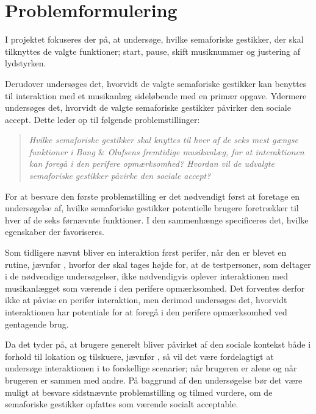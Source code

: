 \section{Problemformulering}
\label{Problemformulering}
%
I projektet fokuseres der på, at undersøge, hvilke semaforiske gestikker, der skal tilknyttes de valgte funktioner; start, pause, skift musiknummer og justering af lydstyrken. 

Derudover undersøges det, hvorvidt de valgte semaforiske gestikker kan benyttes til interaktion med et musikanlæg sideløbende med en primær opgave. Ydermere undersøges det, hvorvidt de valgte semaforiske gestikker påvirker den sociale accept. Dette leder op til følgende problemstillinger:\blankline
%
\begin{quotation}
	\noindent
	\textit{Hvilke semaforiske gestikker skal knyttes til hver af de seks mest gængse funktioner i Bang $\&$ Olufsens fremtidige musikanlæg, for at interaktionen kan foregå i den perifere opmærksomhed?\blankline
		Hvordan vil de udvalgte semaforiske gestikker påvirke den sociale accept?}\blankline
\end{quotation}
%
For at besvare den første problemstilling er det nødvendigt først at foretage en undersøgelse af, hvilke semaforiske gestikker potentielle brugere foretrækker til hver af de seks førnævnte funktioner. I den sammenhænge specificeres det, hvilke egenskaber der favoriseres.

Som tidligere nævnt bliver en interaktion først perifer, når den er blevet en rutine, jævnfør , hvorfor der skal tages højde for, at de testpersoner, som deltager i de nødvendige undersøgelser, ikke nødvendigvis oplever interaktionen med musikanlægget som værende i den perifere opmærksomhed. Det forventes derfor ikke at påvise en perifer interaktion, men derimod undersøges det, hvorvidt interaktionen har potentiale for at foregå i den perifere opmærksomhed ved gentagende brug. 

Da det tyder på, at brugere generelt bliver påvirket af den sociale kontekst både i forhold til lokation og tilskuere, jævnfør , så vil det være fordelagtigt at undersøge interaktionen i to forskellige scenarier; når brugeren er alene og når brugeren er sammen med andre. På baggrund af den undersøgelse bør det være muligt at besvare sidstnævnte problemstilling og tilmed vurdere, om de semaforiske gestikker opfattes som værende socialt acceptable. 




